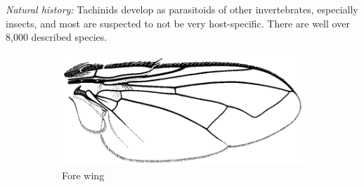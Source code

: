 \documentclass[letterpaper, 11pt]{article}
\begin{document}
\noindent{}\textit{Natural history:} Tachinids develop as parasitoids of other invertebrates, especially insects, and most are suspected to not be very host-specific. There are well over 8,000 described species.

\begin{figure}[ht!]
    \centering
    \begin{subfigure}[ht!]{0.5\textwidth}
        \includegraphics[width=\textwidth]{TachinidWing}
        \caption{Fore wing \citep[][Fig. 110.201]{mcalpine1981manualv2}}
        \label{fig:tachinid1}
    \end{subfigure}
    \qquad
    \begin{subfigure}[ht!]{0.21\textwidth}

\end{subfigure}
\end{figure}
\end{document}
